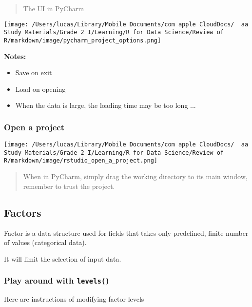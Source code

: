 \documentclass[
]{article}
\let\oldincludegraphics\includegraphics
\renewcommand{\includegraphics}[2][]{\begin{center}\oldincludegraphics[#1]{#2}\end{center}}
\begin{document}
\begin{quote}
The UI in PyCharm
\end{quote}

\texttt{[image: /Users/lucas/Library/Mobile Documents/com~apple~CloudDocs/~~aa Study Materials/Grade 2 I/Learning/R for Data Science/Review of R/markdown/image/pycharm\_project\_options.png]}

\textbf{Notes:}

\begin{itemize}
\item
  Save on exit
\item
  Load on opening
\item
  When the data is large, the loading time may be too long ...
\end{itemize}

\hypertarget{open-a-project}{%
\subsubsection{Open a project}\label{open-a-project}}

\texttt{[image: /Users/lucas/Library/Mobile Documents/com~apple~CloudDocs/~~aa Study Materials/Grade 2 I/Learning/R for Data Science/Review of R/markdown/image/rstudio\_open\_a\_project.png]}

\begin{quote}
When in PyCharm, simply drag the working directory to its main window,
remember to trust the project.
\end{quote}

\hypertarget{factors}{%
\subsection{Factors}\label{factors}}

Factor is a data structure used for fields that takes only predefined,
finite number of values (categorical data).

It will limit the selection of input data.

\hypertarget{play-around-with-levels}{%
\subsubsection{\texorpdfstring{Play around with
\texttt{levels()}}{Play around with levels()}}\label{play-around-with-levels}}

Here are instructions of modifying factor levels
\end{document}
